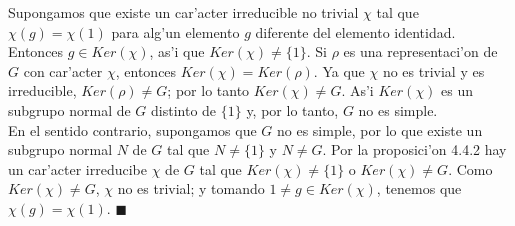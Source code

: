 \documentclass[a4paper,openright,12pt]{book}
\numberwithin{equation}{section} %
\newenvironment{proof}{\noindent{\it Demostracion:}}{\hfill$\blacksquare$} %
\begin{document}
\begin{proof}
Supongamos que existe un car'acter irreducible no trivial $\chi$ tal que $\chi (g)=\chi (1)$ para alg'un elemento $g$ diferente del elemento identidad. Entonces $g \in Ker (\chi)$, as'i que $Ker (\chi) \neq \{ 1 \}$. Si $\rho$ es una representaci'on de $G$ con car'acter $\chi$, entonces $Ker (\chi) = Ker (\rho)$. Ya que $\chi$ no es trivial y es irreducible, $Ker (\rho) \neq G$; por lo tanto $Ker (\chi) \neq G$. As'i $Ker (\chi)$ es un subgrupo normal de $G$ distinto de $\{ 1 \}$ y, por lo tanto, $G$ no es simple.\\
En el sentido contrario, supongamos que $G$ no es simple, por lo que existe un subgrupo normal $N$ de $G$ tal que $N \neq \{ 1 \}$ y $N \neq G$. Por la proposici'on 4.4.2 hay un car'acter irreducibe $\chi$ de $G$ tal que $Ker (\chi) \neq \{ 1 \}$ o $Ker (\chi) \neq G$. Como $Ker (\chi) \neq G$, $\chi$ no es trivial; y tomando $1 \neq g \in Ker (\chi)$, tenemos que $\chi (g) = \chi (1)$. 
\end{proof}
\end{document}
